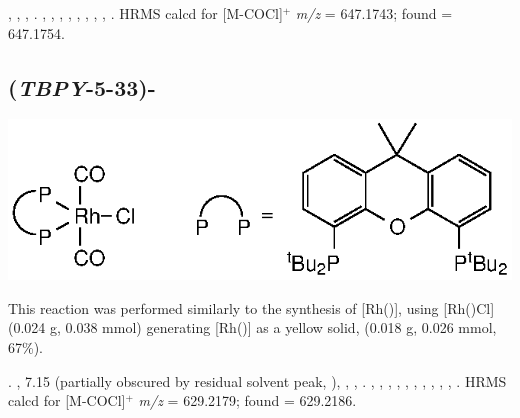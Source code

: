 ,
,
,
.
,
,
,
,
,
,
,
,
.
HRMS calcd for  [M-COCl]$^+$ \emph{m/z} = 647.1743; found = 647.1754.



\subsection*{(\emph{TBPY}-5-33)-}

\begin{structure}[h]
\begin{center}
\includegraphics{../Structures/RhCl(CtBu)(CO)2.eps}
\end{center}
\end{structure}

This reaction was performed similarly to the synthesis of [Rh(\tBusixantphos)], using [Rh(\tBuxantphos)Cl] (0.024 g, 0.038 mmol) generating [Rh(\tBuxantphos)] as a yellow solid, (0.018 g, 0.026 mmol, 67\%).  

.
,
7.15 (partially obscured by residual solvent peak, \CtBuaH),
,
,
.
,
,
,
,
,
,
,
,
,
,
.
HRMS calcd for  [M-COCl]$^+$ \emph{m/z} = 629.2179; found = 629.2186.



